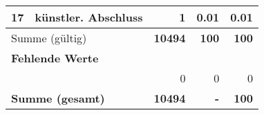 \begin{longtable}{lXrrr}
     17 &
     \multicolumn{1}{X}{ künstler. Abschluss   } &


       \num{1} &
       \num[round-mode=places,round-precision=2]{0,01} &
         \num[round-mode=places,round-precision=2]{0,01} \\
     \midrule
     \multicolumn{2}{l}{Summe (gültig)} &
       \textbf{\num{10494}} &
     \textbf{100} &
       \textbf{\num[round-mode=places,round-precision=2]{100}} \\
     \multicolumn{5}{l}{\textbf{Fehlende Werte}}\\
      & & 0 & 0 & 0 \\
     \midrule
     \multicolumn{2}{l}{\textbf{Summe (gesamt)}} &
          \textbf{\num{10494}} &
        \textbf{-} &
        \textbf{100} \\
     \bottomrule
     \end{longtable}
     

